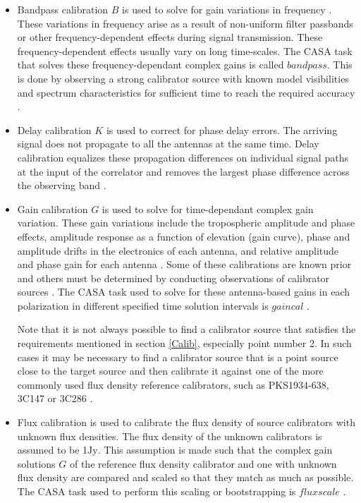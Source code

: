 \begin{itemize}

\item Bandpass calibration $B$ is used to solve for gain variations
in frequency \citep{editioncasa}. These variations in frequency arise as a result of non-uniform filter passbands or other frequency-dependent effects during signal transmission. These frequency-dependent effects usually vary on long time-scales. The CASA task that solves these frequency-dependant complex gains is called $\textit{bandpass}$. This is done by observing a strong calibrator source with known model visibilities and spectrum characteristics for sufficient time to reach the required accuracy \citep{taylor1999synthesis}.

\item Delay calibration $K$ is used to correct for phase delay errors. The arriving signal does not propagate to all the antennas at the same time. Delay calibration equalizes these propagation differences on individual signal paths at the input of the correlator and removes the largest phase difference across the observing band \citep{taylor1999synthesis}.   

\item Gain calibration $G$ is used to solve for time-dependant complex gain variation. These gain variations include the tropospheric amplitude and phase effects, amplitude response as a function of elevation (gain curve), phase and amplitude drifts in the electronics of each antenna, and relative amplitude and phase gain for each antenna \citep{taylor1999synthesis}. Some of these calibrations are known prior and others must be determined by conducting observations of calibrator sources \citep{taylor1999synthesis}. The CASA task used to solve for these antenna-based gains in each polarization in different specified time solution intervals  is $\textit{gaincal}$ \citep{editioncasa}.  

Note that it is not always possible to find a calibrator source that satisfies the requirements mentioned in section \ref{Calib}, especially point number 2. In such cases it may be necessary to find a calibrator source that is a point source  close to the target source and then calibrate it against one of the more commonly used flux density reference calibrators, such as PKS1934-638, 3C147 or 3C286 \citep{thompson2001interferometry}. 

\item Flux calibration is used to calibrate the flux density of source calibrators with unknown flux densities. The flux density of the unknown calibrators is assumed to be 1$\mathrm{Jy}$. This assumption is made such that the complex gain solutions $G$ of the reference flux density calibrator and one with unknown flux density are compared and scaled so that they match as much as possible. The CASA task used to perform this scaling or bootstrapping is $\textit{fluxscale}$ \citep{editioncasa}.
\end{itemize}

